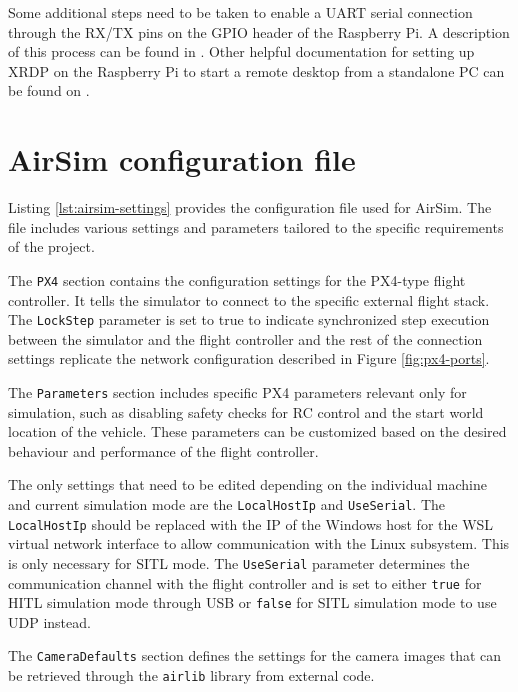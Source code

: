Some additional steps need to be taken to enable a UART serial connection through the RX/TX pins on the GPIO header of the Raspberry Pi. A description of this process can be found in \cite{rpi-uart-setup}.
Other helpful documentation for setting up XRDP on the Raspberry Pi to start a remote desktop from a standalone PC can be found on \cite{install-xrdp}.


\section{AirSim configuration file}
\label{app:airsim-config}

Listing \ref{lst:airsim-settings} provides the configuration file used for AirSim. The file includes various settings and parameters tailored to the specific requirements of the project.

The \texttt{PX4} section contains the configuration settings for the PX4-type flight controller. It tells the simulator to connect to the specific external flight stack. The \texttt{LockStep} parameter is set to true to indicate synchronized step execution between the simulator and the flight controller and the rest of the connection settings replicate the network configuration described in Figure \ref{fig:px4-ports}.

The \texttt{Parameters} section includes specific PX4 parameters relevant only for simulation, such as disabling safety checks for RC control and the start world location of the vehicle.
These parameters can be customized based on the desired behaviour and performance of the flight controller.

The only settings that need to be edited depending on the individual machine and current simulation mode are the \texttt{LocalHostIp} and \texttt{UseSerial}.
The \texttt{LocalHostIp} should be replaced with the IP of the Windows host for the WSL virtual network interface to allow communication with the Linux subsystem. This is only necessary for SITL mode.
The \texttt{UseSerial} parameter determines the communication channel with the flight controller and is set to either \texttt{true} for HITL simulation mode through USB or \texttt{false} for SITL simulation mode to use UDP instead.

The \texttt{CameraDefaults} section defines the settings for the camera images that can be retrieved through the \texttt{airlib} library from external code. 

